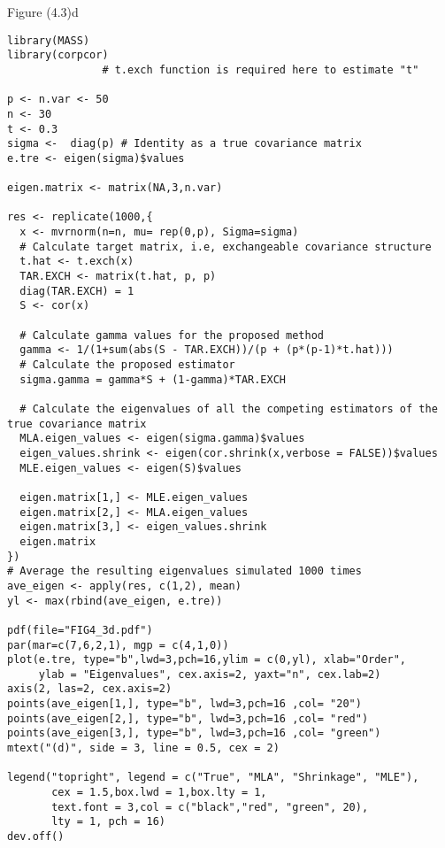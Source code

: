 Figure (4.3)d
\begin{lstlisting}
library(MASS)
library(corpcor)
               # t.exch function is required here to estimate "t"

p <- n.var <- 50
n <- 30
t <- 0.3
sigma <-  diag(p) # Identity as a true covariance matrix
e.tre <- eigen(sigma)$values

eigen.matrix <- matrix(NA,3,n.var)

res <- replicate(1000,{
  x <- mvrnorm(n=n, mu= rep(0,p), Sigma=sigma)
  # Calculate target matrix, i.e, exchangeable covariance structure
  t.hat <- t.exch(x)
  TAR.EXCH <- matrix(t.hat, p, p)
  diag(TAR.EXCH) = 1
  S <- cor(x)
  
  # Calculate gamma values for the proposed method
  gamma <- 1/(1+sum(abs(S - TAR.EXCH))/(p + (p*(p-1)*t.hat)))
  # Calculate the proposed estimator
  sigma.gamma = gamma*S + (1-gamma)*TAR.EXCH
  
  # Calculate the eigenvalues of all the competing estimators of the true covariance matrix
  MLA.eigen_values <- eigen(sigma.gamma)$values
  eigen_values.shrink <- eigen(cor.shrink(x,verbose = FALSE))$values
  MLE.eigen_values <- eigen(S)$values
  
  eigen.matrix[1,] <- MLE.eigen_values
  eigen.matrix[2,] <- MLA.eigen_values
  eigen.matrix[3,] <- eigen_values.shrink
  eigen.matrix
})
# Average the resulting eigenvalues simulated 1000 times 
ave_eigen <- apply(res, c(1,2), mean)
yl <- max(rbind(ave_eigen, e.tre))

pdf(file="FIG4_3d.pdf")
par(mar=c(7,6,2,1), mgp = c(4,1,0))
plot(e.tre, type="b",lwd=3,pch=16,ylim = c(0,yl), xlab="Order",
     ylab = "Eigenvalues", cex.axis=2, yaxt="n", cex.lab=2)
axis(2, las=2, cex.axis=2)
points(ave_eigen[1,], type="b", lwd=3,pch=16 ,col= "20")
points(ave_eigen[2,], type="b", lwd=3,pch=16 ,col= "red")
points(ave_eigen[3,], type="b", lwd=3,pch=16 ,col= "green")
mtext("(d)", side = 3, line = 0.5, cex = 2)

legend("topright", legend = c("True", "MLA", "Shrinkage", "MLE"),
       cex = 1.5,box.lwd = 1,box.lty = 1,
       text.font = 3,col = c("black","red", "green", 20),
       lty = 1, pch = 16)
dev.off()
\end{lstlisting}

